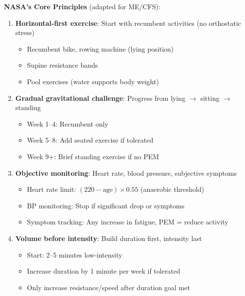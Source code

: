 \begin{tcolorbox}[colback=green!5!white,colframe=green!75!black,title=Space Medicine Reconditioning Principles for ME/CFS]

\textbf{NASA's Core Principles} (adapted for ME/CFS):

\begin{enumerate}
    \item \textbf{Horizontal-first exercise}: Start with recumbent activities (no orthostatic stress)
    \begin{itemize}
        \item Recumbent bike, rowing machine (lying position)
        \item Supine resistance bands
        \item Pool exercises (water supports body weight)
    \end{itemize}

    \item \textbf{Gradual gravitational challenge}: Progress from lying $\rightarrow$ sitting $\rightarrow$ standing
    \begin{itemize}
        \item Week 1--4: Recumbent only
        \item Week 5--8: Add seated exercise if tolerated
        \item Week 9+: Brief standing exercise if no PEM
    \end{itemize}

    \item \textbf{Objective monitoring}: Heart rate, blood pressure, subjective symptoms
    \begin{itemize}
        \item Heart rate limit: $(220 - \text{age}) \times 0.55$ (anaerobic threshold)
        \item BP monitoring: Stop if significant drop or symptoms
        \item Symptom tracking: Any increase in fatigue, PEM = reduce activity
    \end{itemize}

    \item \textbf{Volume before intensity}: Build duration first, intensity last
    \begin{itemize}
        \item Start: 2--5 minutes low-intensity
        \item Increase duration by 1 minute per week if tolerated
        \item Only increase resistance/speed after duration goal met
    \end{itemize}


\end{enumerate}
\end{tcolorbox}
